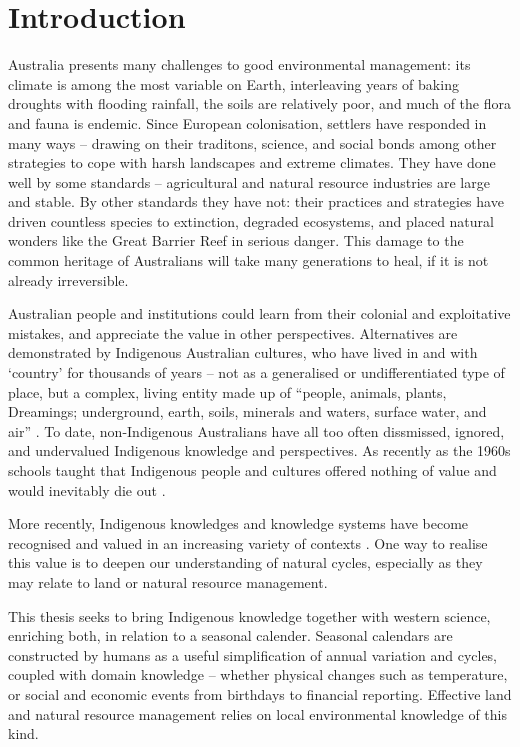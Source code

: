 \chapter{Introduction}
\label{ch:introduction}

Australia presents many challenges to good environmental management: its
climate is among the most variable on Earth, interleaving years of baking
droughts with flooding rainfall, the soils are relatively poor, and much of
the flora and fauna is endemic.
%
Since European colonisation, settlers have responded in many ways --
drawing on their traditons, science, and social bonds among other strategies to cope
with harsh landscapes and extreme climates.
%
They have done well by some standards -- agricultural and natural
resource industries are large and stable.  By other standards they have not:
their practices and strategies have driven countless species to extinction,
degraded ecosystems, and placed natural wonders like the Great Barrier Reef
in serious danger.  This damage to the common heritage of Australians will
take many generations to heal, if it is not already irreversible.

Australian people and institutions could learn from their colonial and exploitative mistakes,
and appreciate the value in other perspectives.  Alternatives are demonstrated
by Indigenous Australian cultures, who have lived in and with `country' for
thousands of years -- not as a generalised or undifferentiated
type of place, but a complex, living entity made up of ``people, animals,
plants, Dreamings; underground, earth, soils, minerals and waters, surface
water, and air'' \citep[][p7]{birdrose1996}.
%
To date, non-Indigenous Australians
have all too often dissmissed, ignored, and undervalued Indigenous knowledge
and perspectives.  As recently as the 1960s schools taught that Indigenous
people and cultures offered nothing of value and would inevitably die out
\citep{flannery1994}.


More recently, Indigenous knowledges and knowledge systems have become recognised and valued in an
increasing variety of contexts \citep[eg.][]{petheram2010,cochran2015,
berkes2012}.  One way to realise this value is to deepen our understanding
of natural cycles, especially as they may relate to land or natural resource
management.

This thesis seeks to bring Indigenous knowledge together with
western science, enriching both, in relation to a seasonal calender.
Seasonal calendars are constructed by humans as a useful simplification of
annual variation and cycles, coupled with domain knowledge -- whether
physical changes such as temperature, or social and economic events from birthdays to
financial reporting.  Effective land and natural resource management relies on
local environmental knowledge of this kind.

